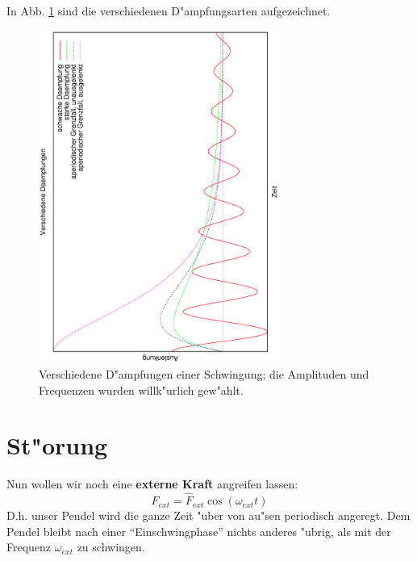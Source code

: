 In Abb. \ref{abb_daempf} sind die verschiedenen D"ampfungsarten aufgezeichnet.

\begin{figure}[h]
   \centering
   \includegraphics[width=0.7\textwidth,angle=-90]{bilder/dampf01}
   \caption[Dämpfungen einer Schwingung]{Verschiedene D"ampfungen
     einer Schwingung; die Amplituden und Frequenzen wurden
     willk"urlich gew"ahlt.}
   \label{abb_daempf}
\end{figure}









\section{St"orung}
\label{kap_storung}





Nun wollen wir noch eine \textbf{externe Kraft} angreifen lassen:
\begin{equation}
   \label{eq:107}
   F_{ext} = \hat F_{ext} \cos (\omega_{ext} t)
\end{equation}
D.h. unser Pendel wird die ganze Zeit "uber von au"sen periodisch
angeregt. Dem Pendel bleibt nach einer "`Einschwingphase"' nichts
anderes "ubrig, als mit der Frequenz $\omega_{ext}$ zu schwingen. 

